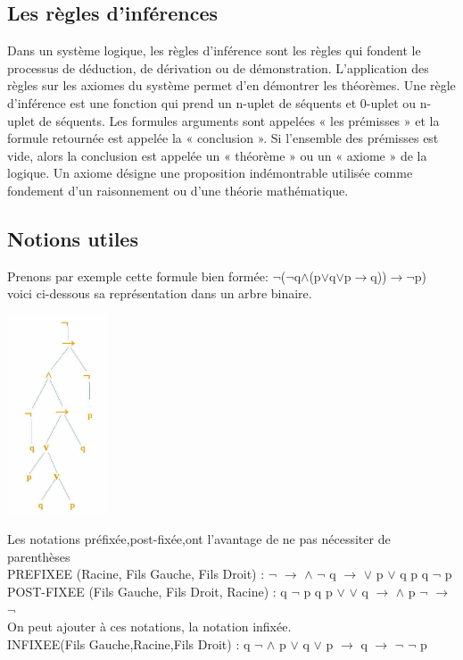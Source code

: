 \documentclass[a4paper,12pt]{article}
\begin{document}
\subsection{Les règles d'inférences}
Dans un système logique, les règles d'inférence sont les règles qui fondent le processus de déduction, de dérivation ou de démonstration. 
L'application des règles sur les axiomes du système permet d'en démontrer les théorèmes.
Une règle d'inférence est une fonction qui prend un n-uplet de séquents et 0-uplet ou n-uplet de séquents. Les formules arguments sont appelées « les prémisses » et la formule retournée est appelée la « conclusion ». 
Si l'ensemble des prémisses est vide, alors la conclusion est appelée un « théorème » ou un « axiome » de la logique.
Un axiome désigne une proposition indémontrable utilisée comme fondement d’un raisonnement ou d’une théorie mathématique.


\subsection{Notions utiles}
 Prenons par exemple cette formule bien formée: $\neg$($\neg$q$\wedge$(p$\vee$q$\vee$p$\rightarrow$q))$\rightarrow \neg$p)\\
 voici ci-dessous sa représentation dans un arbre binaire.\\
\begin{center}
 \includegraphics[width=30mm]{image1.png}
 \end{center}
 Les notations préfixée,post-fixée,ont l'avantage de ne pas nécessiter de parenthèses \\
 PREFIXEE (Racine, Fils Gauche, Fils Droit) :    $\neg$ $\rightarrow$ $\wedge$ $\neg$ q $\rightarrow$ $\vee$ p $\vee$ q p q $\neg$ p \\ 
 POST-FIXEE (Fils Gauche, Fils Droit, Racine) :  q  $\neg$  p  q  p  $\vee$  $\vee$ q  $\rightarrow$  $\wedge$ p $\neg$ $\rightarrow$ $\neg$\\
 On peut ajouter à ces notations, la notation infixée.\\
 INFIXEE(Fils Gauche,Racine,Fils Droit) : q $\neg$ $\wedge$ p $\vee$ q $\vee$ p $\rightarrow$ q $\rightarrow$ $\neg$ $\neg$ p
\end{document}
